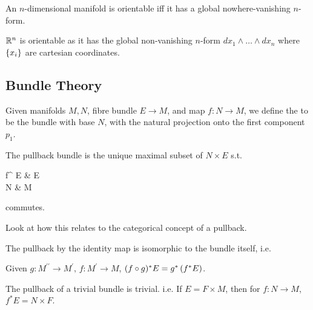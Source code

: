 \documentclass{article}
\begin{document}
\begin{prop}
	An $n$-dimensional manifold is orientable iff it has a global nowhere-vanishing $n$-form. 
\end{prop}

\begin{example}
	$\mathbb{R}^n$ is orientable as it has the global non-vanishing $n$-form $dx_1 \wedge \dots \wedge dx_n$ where $\left\{ x_i \right\}$ are cartesian coordinates.  
\end{example}

\subsection{Bundle Theory}
\begin{definition}
	Given manifolds $M,N$, fibre bundle $E \to M$, and map $f:N \to M$, we define the  to be 
the bundle with base $N$, with the natural projection onto the first component $p_1$. 
\end{definition}

\begin{lemma}
The pullback bundle is the unique maximal subset of $N \times E$ s.t. 
\begin{tkz}
	f^{\ast} E \arrow[r,"p_2"] \arrow[d,"p_1"'] & E \arrow[d,"\pi"] \\
	N \arrow[r,"f"'] & M
\end{tkz} 
commutes.
\end{lemma}

\begin{ex}
	Look at how this relates to the categorical concept of a pullback. 
\end{ex}

\begin{example}
	The pullback by the identity map is isomorphic to the bundle itself, i.e. 
\end{example}

\begin{lemma}
Given $g:M^{\prime\prime}\to M^{\prime}, \, f:M^\prime \to M$, $(f \circ g)^{\ast}E = g^{\ast}\left( f^{\ast}E \right)$.
\end{lemma}

\begin{lemma}
	The pullback of a trivial bundle is trivial. i.e. If $E =F \times M$, then for $f:N \to M$, $f^{\ast}E = N \times F$.
\end{lemma}
\end{document}
